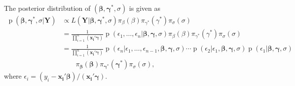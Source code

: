 \documentclass[12pt]{article}
\DeclareMathOperator{\pr}{p}
\begin{document}
The posterior distribution of $(\bm{\beta}, \bm{\gamma^{*}}, \sigma)$ is given as
\begin{equation}\label{ch2:eq:post}
  \begin{aligned}
    \pr(\bm{\beta}, \bm{\gamma^{*}}, \sigma|\bm{Y}) & \propto L(\bm{Y}| \bm{\beta}, \bm{\gamma^{*}}, \sigma)
\pi_{\beta}(\beta) \pi_{\gamma^{*}}(\gamma^{*}) \pi_{\sigma}(\sigma) \\
    & = \frac{1}{\prod_{i=1}^n (\bm{x_i\prime\gamma})} \pr \left(\epsilon_1, \ldots, \epsilon_n | \bm{\beta}, \bm{\gamma}, \sigma\right)
 \pi_{\beta}(\beta) \pi_{\gamma^{*}}(\gamma^{*}) \pi_{\sigma}(\sigma) \\
    & = \frac{1}{\prod_{i=1}^n (\bm{x_i\prime\gamma})} \pr \left(\epsilon_n| \epsilon_1, \ldots, \epsilon_{n-1}, \bm{\beta}, \bm{\gamma}, \sigma\right) \cdots \pr \left(\epsilon_2| \epsilon_1, \bm{\beta}, \bm{\gamma}, \sigma\right)
\pr \left(\epsilon_1| \bm{\beta}, \bm{\gamma}, \sigma\right)\\
    & \qquad \pi_{\bm{\beta}}(\bm{\beta}) \pi_{\bm{\gamma}^{*}}(\bm{\gamma}^{*}) \pi_{\sigma}(\sigma),
  \end{aligned}
\end{equation}
where $\epsilon_i = (y_i - \bm{x_i\prime\beta})/(\bm{x_i\prime\gamma})$.
\end{document}

